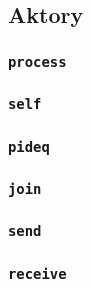 \subsection{Aktory}
\label{viua_vm_ops_actor}

\subsubsection{\texttt{process}}
\subsubsection{\texttt{self}}
\subsubsection{\texttt{pideq}}
\subsubsection{\texttt{join}}
\subsubsection{\texttt{send}}
\subsubsection{\texttt{receive}}
